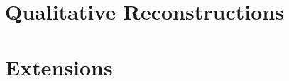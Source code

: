 \section{Qualitative Reconstructions}
\label{sec:qualitative}

%
%



\section{Extensions}
\label{sec:extensions}




